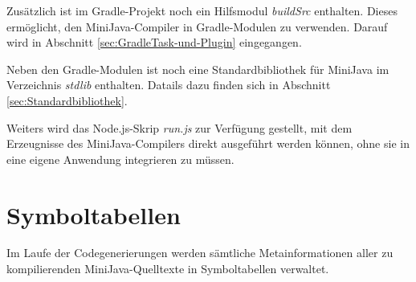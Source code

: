 Zusätzlich ist im Gradle-Projekt noch ein Hilfsmodul \emph{buildSrc} enthalten. Dieses ermöglicht, den MiniJava-Compiler in Gradle-Modulen zu verwenden. Darauf wird in Abschnitt \ref{sec:GradleTask-und-Plugin} eingegangen.

Neben den Gradle-Modulen ist noch eine Standardbibliothek für MiniJava im Verzeichnis \emph{stdlib} enthalten. Datails dazu finden sich in Abschnitt \ref{sec:Standardbibliothek}.

Weiters wird das Node.js-Skrip \emph{run.js} zur Verfügung gestellt, mit dem Erzeugnisse des MiniJava-Compilers direkt ausgeführt werden können, ohne sie in eine eigene Anwendung integrieren zu müssen.

\section{Symboltabellen}

Im Laufe der Codegenerierungen werden sämtliche Metainformationen aller zu kompilierenden MiniJava-Quelltexte in Symboltabellen verwaltet.

